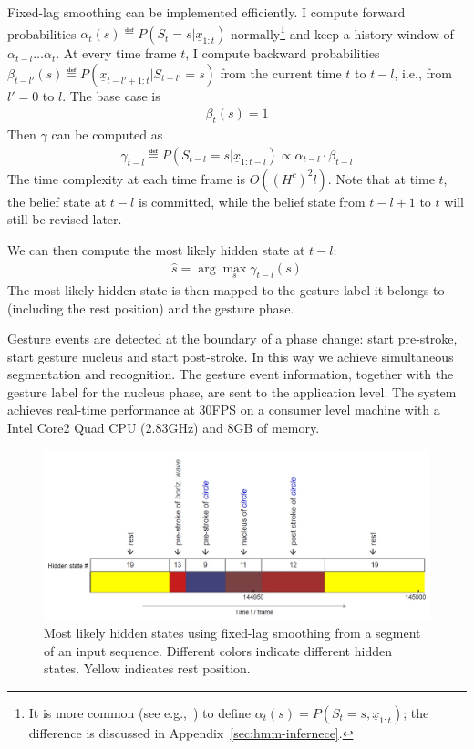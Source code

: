 Fixed-lag smoothing can be implemented efficiently. I compute forward
probabilities $\alpha_t(s) \eqdef P(S_t = s|\underline{x}_{1:t})$
normally\footnote{It is more common (see e.g.,~\cite{Rabiner90}) to define
$\alpha_t(s) = P(S_t = s, \underline{x}_{1:t})$; the difference is discussed in
Appendix~\ref{sec:hmm-infernece}.} and keep a history window of
$\alpha_{t - l}\ldots\alpha_t$.
At every time frame $t$, I compute backward probabilities
$\beta_{t-l'}(s)\eqdef P(\underline{x}_{t-l'+1:t}|S_{t-l'}=s)$ from the current time $t$ to $t - l$,
i.e., from $l' = 0$ to $l$. The base case is 
\begin{align}
\beta_t(s) = 1
\end{align}
Then $\gamma$ can be computed as
\begin{align}
\gamma_{t - l} \eqdef P(S_{t-l}=s|\underline{x}_{1:t-l}) \propto \alpha_{t -
l}
\cdot
\beta_{t - l}
\end{align}  
The time complexity at each time frame is $O((H^c)^2l)$. Note that at time $t$,
the belief state at $t - l$ is committed, while the belief state from $t - l + 1$ to $t$
will still be revised later.

We can then compute the most likely hidden state at $t - l$:
\begin{align}
\hat{s} = \arg\max_s \gamma_{t - l}(s)
\end{align}
The most likely hidden state is then mapped to the gesture label it
belongs to (including the rest position) and the gesture phase. 

Gesture events are detected at the boundary of a phase change: start pre-stroke,
start gesture nucleus and start post-stroke. In this way
we achieve simultaneous segmentation and recognition. The gesture event
information, together with the gesture label for the nucleus phase, are sent to the application level.
The system achieves real-time performance at 30FPS on a consumer level machine
with a Intel Core2 Quad CPU (2.83GHz) and 8GB of memory.

\begin{figure}[t]
\centering
\includegraphics[trim=0 0 0
5mm, clip, width=\columnwidth]{figures/hidden_labeled.jpg}
\caption{Most likely hidden states using fixed-lag smoothing from a segment of
an input sequence.
Different colors indicate different hidden states. Yellow indicates rest position.}
\label{fig:visual_hidden}
\end{figure}

